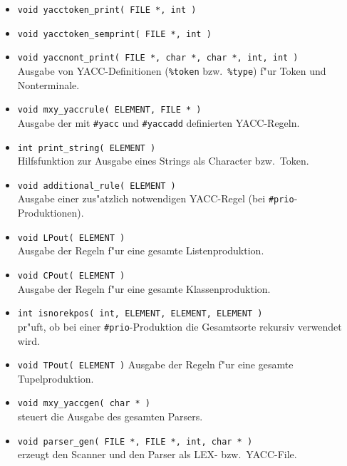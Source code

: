 \begin{itemize}
\item {\tt void yacctoken\_print( FILE *, int ) }
\item {\tt void yacctoken\_semprint( FILE *, int )}
\item {\tt void yaccnont\_print( FILE *, char *, char *, int, int )}\\
Ausgabe von YACC-Definitionen ({\tt \%token} bzw.\ {\tt \%type})
f"ur Token und Nonterminale.

\item {\tt void mxy\_yaccrule( ELEMENT, FILE * )}\\
Ausgabe der mit {\tt \#yacc} und {\tt \#yaccadd} definierten YACC-Regeln.

\item {\tt int print\_string( ELEMENT )}\\
Hilfsfunktion zur Ausgabe eines Strings als Character bzw.\ Token.

\item {\tt void additional\_rule( ELEMENT )}\\
Ausgabe einer zus"atzlich notwendigen YACC-Regel (bei {\tt \#prio}-Produktionen).

\item {\tt void LPout( ELEMENT )}\\
Ausgabe der Regeln f"ur eine gesamte Listenproduktion.

\item {\tt void CPout( ELEMENT )}\\
Ausgabe der Regeln f"ur eine gesamte Klassenproduktion.

\item {\tt int isnorekpos( int, ELEMENT, ELEMENT, ELEMENT )}\\
pr"uft, ob bei einer {\tt \#prio}-Produktion die Gesamtsorte rekursiv
verwendet wird.

\item {\tt void TPout( ELEMENT )}
Ausgabe der Regeln f"ur eine gesamte Tupelproduktion.

\item {\tt void mxy\_yaccgen( char * )}\\
steuert die Ausgabe des gesamten Parsers.

\item {\tt void parser\_gen( FILE *, FILE *, int, char * )}\\
erzeugt den Scanner und den Parser als LEX- bzw.\ YACC-File.
\end{itemize}

